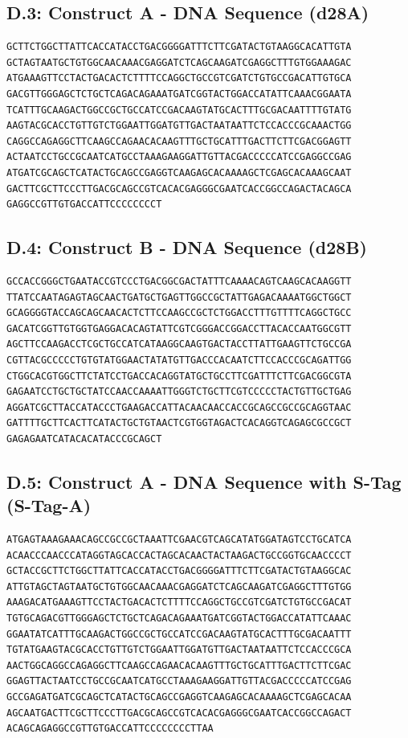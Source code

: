 \subsection*{D.3: Construct A - DNA Sequence (d28A)}
\begin{verbatim}
GCTTCTGGCTTATTCACCATACCTGACGGGGATTTCTTCGATACTGTAAGGCACATTGTA
GCTAGTAATGCTGTGGCAACAAACGAGGATCTCAGCAAGATCGAGGCTTTGTGGAAAGAC
ATGAAAGTTCCTACTGACACTCTTTTCCAGGCTGCCGTCGATCTGTGCCGACATTGTGCA
GACGTTGGGAGCTCTGCTCAGACAGAAATGATCGGTACTGGACCATATTCAAACGGAATA
TCATTTGCAAGACTGGCCGCTGCCATCCGACAAGTATGCACTTTGCGACAATTTTGTATG
AAGTACGCACCTGTTGTCTGGAATTGGATGTTGACTAATAATTCTCCACCCGCAAACTGG
CAGGCCAGAGGCTTCAAGCCAGAACACAAGTTTGCTGCATTTGACTTCTTCGACGGAGTT
ACTAATCCTGCCGCAATCATGCCTAAAGAAGGATTGTTACGACCCCCATCCGAGGCCGAG
ATGATCGCAGCTCATACTGCAGCCGAGGTCAAGAGCACAAAAGCTCGAGCACAAAGCAAT
GACTTCGCTTCCCTTGACGCAGCCGTCACACGAGGGCGAATCACCGGCCAGACTACAGCA
GAGGCCGTTGTGACCATTCCCCCCCCT
\end{verbatim}
\subsection*{D.4: Construct B - DNA Sequence (d28B)}
\begin{verbatim}
GCCACCGGGCTGAATACCGTCCCTGACGGCGACTATTTCAAAACAGTCAAGCACAAGGTT
TTATCCAATAGAGTAGCAACTGATGCTGAGTTGGCCGCTATTGAGACAAAATGGCTGGCT
GCAGGGGTACCAGCAGCAACACTCTTCCAAGCCGCTCTGGACCTTTGTTTTCAGGCTGCC
GACATCGGTTGTGGTGAGGACACAGTATTCGTCGGGACCGGACCTTACACCAATGGCGTT
AGCTTCCAAGACCTCGCTGCCATCATAAGGCAAGTGACTACCTTATTGAAGTTCTGCCGA
CGTTACGCCCCCTGTGTATGGAACTATATGTTGACCCACAATCTTCCACCCGCAGATTGG
CTGGCACGTGGCTTCTATCCTGACCACAGGTATGCTGCCTTCGATTTCTTCGACGGCGTA
GAGAATCCTGCTGCTATCCAACCAAAATTGGGTCTGCTTCGTCCCCCTACTGTTGCTGAG
AGGATCGCTTACCATACCCTGAAGACCATTACAACAACCACCGCAGCCGCCGCAGGTAAC
GATTTTGCTTCACTTCATACTGCTGTAACTCGTGGTAGACTCACAGGTCAGAGCGCCGCT
GAGAGAATCATACACATACCCGCAGCT
\end{verbatim}
\subsection*{D.5: Construct A - DNA Sequence with S-Tag (S-Tag-A)}
\begin{verbatim}
ATGAGTAAAGAAACAGCCGCCGCTAAATTCGAACGTCAGCATATGGATAGTCCTGCATCA
ACAACCCAACCCATAGGTAGCACCACTAGCACAACTACTAAGACTGCCGGTGCAACCCCT
GCTACCGCTTCTGGCTTATTCACCATACCTGACGGGGATTTCTTCGATACTGTAAGGCAC
ATTGTAGCTAGTAATGCTGTGGCAACAAACGAGGATCTCAGCAAGATCGAGGCTTTGTGG
AAAGACATGAAAGTTCCTACTGACACTCTTTTCCAGGCTGCCGTCGATCTGTGCCGACAT
TGTGCAGACGTTGGGAGCTCTGCTCAGACAGAAATGATCGGTACTGGACCATATTCAAAC
GGAATATCATTTGCAAGACTGGCCGCTGCCATCCGACAAGTATGCACTTTGCGACAATTT
TGTATGAAGTACGCACCTGTTGTCTGGAATTGGATGTTGACTAATAATTCTCCACCCGCA
AACTGGCAGGCCAGAGGCTTCAAGCCAGAACACAAGTTTGCTGCATTTGACTTCTTCGAC
GGAGTTACTAATCCTGCCGCAATCATGCCTAAAGAAGGATTGTTACGACCCCCATCCGAG
GCCGAGATGATCGCAGCTCATACTGCAGCCGAGGTCAAGAGCACAAAAGCTCGAGCACAA
AGCAATGACTTCGCTTCCCTTGACGCAGCCGTCACACGAGGGCGAATCACCGGCCAGACT
ACAGCAGAGGCCGTTGTGACCATTCCCCCCCCTTAA
\end{verbatim}
